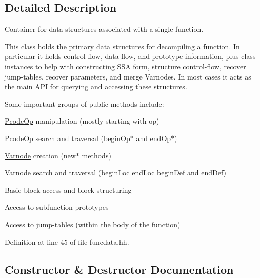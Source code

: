 \subsection{Detailed Description}
Container for data structures associated with a single function. 

This class holds the primary data structures for decompiling a function. In particular it holds control-\/flow, data-\/flow, and prototype information, plus class instances to help with constructing S\+SA form, structure control-\/flow, recover jump-\/tables, recover parameters, and merge Varnodes. In most cases it acts as the main A\+PI for querying and accessing these structures.

Some important groups of public methods include\+:
\begin{DoxyItemize}
\item \mbox{\hyperlink{class_pcode_op}{Pcode\+Op}} manipulation (mostly starting with \textquotesingle{}op\textquotesingle{})
\item \mbox{\hyperlink{class_pcode_op}{Pcode\+Op}} search and traversal (\textquotesingle{}begin\+Op$\ast$\textquotesingle{} and \textquotesingle{}end\+Op$\ast$\textquotesingle{})
\item \mbox{\hyperlink{class_varnode}{Varnode}} creation (\textquotesingle{}new$\ast$\textquotesingle{} methods)
\item \mbox{\hyperlink{class_varnode}{Varnode}} search and traversal (\textquotesingle{}begin\+Loc\textquotesingle{} \textquotesingle{}end\+Loc\textquotesingle{} \textquotesingle{}begin\+Def\textquotesingle{} and \textquotesingle{}end\+Def\textquotesingle{})
\item Basic block access and block structuring
\item Access to subfunction prototypes
\item Access to jump-\/tables (within the body of the function) 
\end{DoxyItemize}

Definition at line 45 of file funcdata.\+hh.



\subsection{Constructor \& Destructor Documentation}
\mbox{\label{class_funcdata_aacdd409dd207aaa412afc5726bc86f6d}} 
